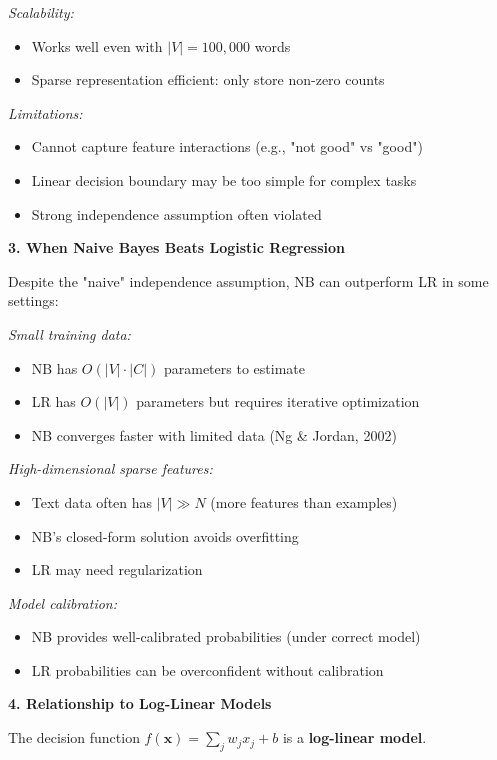 \documentclass[12pt]{article}
\begin{document}
\begin{explanation}
\textit{Scalability:}
\begin{itemize}
    \item Works well even with $|V| = 100{,}000$ words
    \item Sparse representation efficient: only store non-zero counts
\end{itemize}

\textit{Limitations:}
\begin{itemize}
    \item Cannot capture feature interactions (e.g., "not good" vs "good")
    \item Linear decision boundary may be too simple for complex tasks
    \item Strong independence assumption often violated
\end{itemize}

\textbf{3. When Naive Bayes Beats Logistic Regression}

Despite the "naive" independence assumption, NB can outperform LR in some settings:

\textit{Small training data:}
\begin{itemize}
    \item NB has $O(|V| \cdot |C|)$ parameters to estimate
    \item LR has $O(|V|)$ parameters but requires iterative optimization
    \item NB converges faster with limited data (Ng \& Jordan, 2002)
\end{itemize}

\textit{High-dimensional sparse features:}
\begin{itemize}
    \item Text data often has $|V| \gg N$ (more features than examples)
    \item NB's closed-form solution avoids overfitting
    \item LR may need regularization
\end{itemize}

\textit{Model calibration:}
\begin{itemize}
    \item NB provides well-calibrated probabilities (under correct model)
    \item LR probabilities can be overconfident without calibration
\end{itemize}

\textbf{4. Relationship to Log-Linear Models}

The decision function $f(\mathbf{x}) = \sum_j w_j x_j + b$ is a \textbf{log-linear model}.


\end{explanation}
\end{document}
